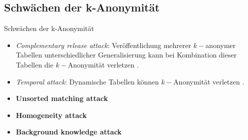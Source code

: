 \subsection{Schwächen der k-Anonymität}

\begin{frame}{Schwächen der k-Anonymität}
	\begin{itemize}
		\item \textit{Complementary release attack}: Veröffentlichung mehrerer \(k-\)anonymer Tabellen unterschiedlicher Generalisierung kann bei Kombination dieser Tabellen die \(k-\)Anonymität verletzen \cite{sweeney_k_anonymity}. %
	
		\item \textit{Temporal attack}: Dynamische Tabellen können \(k-\)Anonymität verletzen \cite{sweeney_k_anonymity}. %

		\item \textbf{Unsorted matching attack} \cite{sweeney_k_anonymity} %

		\item \textbf{Homogeneity attack} \cite{machanavajjhala_l_diversity} %
	
		\item \textbf{Background knowledge attack} \cite{machanavajjhala_l_diversity} %
	\end{itemize}
\end{frame}


